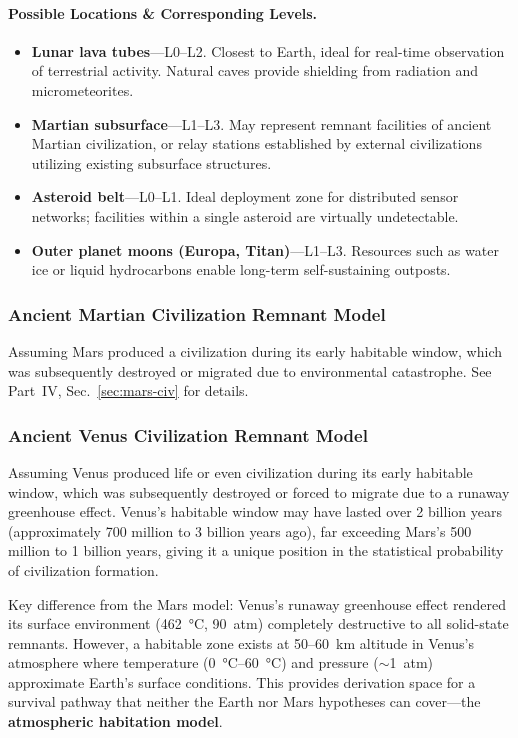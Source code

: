 \documentclass[aps,prd,twocolumn,superscriptaddress,nofootinbib]{revtex4-2}
\begin{document}
\paragraph{Possible Locations \& Corresponding Levels.}

\begin{itemize}
  \item \textbf{Lunar lava tubes}---L0--L2. Closest to Earth, ideal for real-time observation of terrestrial activity. Natural caves provide shielding from radiation and micrometeorites.
  \item \textbf{Martian subsurface}---L1--L3. May represent remnant facilities of ancient Martian civilization, or relay stations established by external civilizations utilizing existing subsurface structures.
  \item \textbf{Asteroid belt}---L0--L1. Ideal deployment zone for distributed sensor networks; facilities within a single asteroid are virtually undetectable.
  \item \textbf{Outer planet moons (Europa, Titan)}---L1--L3. Resources such as water ice or liquid hydrocarbons enable long-term self-sustaining outposts.
\end{itemize}

\subsubsection{Ancient Martian Civilization Remnant Model}\label{sec:mars-remnant}

Assuming Mars produced a civilization during its early habitable window, which was subsequently destroyed or migrated due to environmental catastrophe. See Part~IV, Sec.~\ref{sec:mars-civ} for details.

\subsubsection{Ancient Venus Civilization Remnant Model}\label{sec:venus-remnant}

Assuming Venus produced life or even civilization during its early habitable window, which was subsequently destroyed or forced to migrate due to a runaway greenhouse effect. Venus's habitable window may have lasted over 2 billion years (approximately 700 million to 3 billion years ago), far exceeding Mars's 500 million to 1 billion years, giving it a unique position in the statistical probability of civilization formation.

Key difference from the Mars model: Venus's runaway greenhouse effect rendered its surface environment (\SI{462}{\degreeCelsius}, \SI{90}{atm}) completely destructive to all solid-state remnants. However, a habitable zone exists at 50--60~km altitude in Venus's atmosphere where temperature (\SIrange{0}{60}{\degreeCelsius}) and pressure (${\sim}$\SI{1}{atm}) approximate Earth's surface conditions. This provides derivation space for a survival pathway that neither the Earth nor Mars hypotheses can cover---the \textbf{atmospheric habitation model}.
\end{document}
